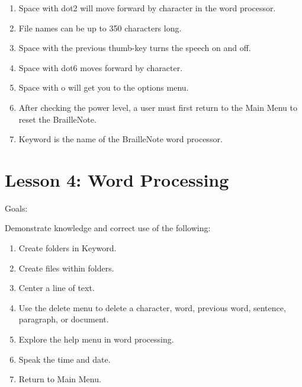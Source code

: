 \documentclass[10pt,letterpaper,twoside]{report}
\begin{document}
{{{{\begin{enumerate}
	\item Space with dot2 will move forward by character in the word processor.
	      
	\item File names can be up to 350 characters long.
	      
	\item Space with the previous thumb-key turns the speech on and off.
	      
	\item Space with dot6 moves forward by character.
	      
	\item Space with o will get you to the options menu.
	      
	\item After checking the power level, a user must first return to the Main Menu to reset the BrailleNote.
	      
	\item Keyword is the name of the BrailleNote word processor.
\end{enumerate}



\section*{Lesson 4: Word Processing}


Goals:



Demonstrate knowledge and correct use of the following:



\begin{enumerate}
	\item Create folders in Keyword.
	      
	\item Create files within folders.
	      
	\item Center a line of text.
	      
	\item Use the delete menu to delete a character, word, previous word, sentence, paragraph, or document.
	      
	\item Explore the help menu in word processing.
	      
	\item Speak the time and date.
	      
	\item Return to Main Menu.
\end{enumerate}



}}}}
\end{document}
